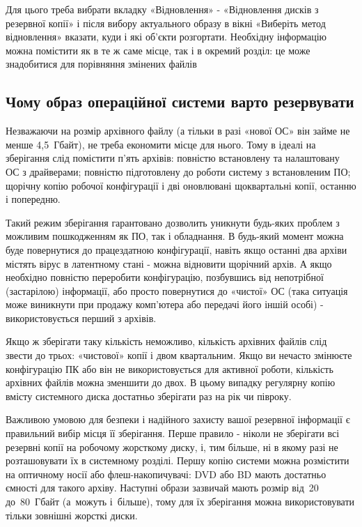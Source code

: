 \documentclass[
	a4paper,
	oneside,
	DIV = 12,
	fontsize = 13pt,
	headings = normal,
]{scrartcl}
\begin{document}
		Для цього треба вибрати вкладку «Відновлення» - «Відновлення дисків з резервної копії» і після вибору актуального образу в вікні «Виберіть метод відновлення» вказати, куди і які об'єкти розгортати. Необхідну інформацію можна помістити як в те ж саме місце, так і в окремий розділ: це може знадобитися для порівняння змінених файлів 

		\subsection*{Чому образ операційної системи варто резервувати}

		Незважаючи на розмір архівного файлу (а тільки в разі «нової ОС» він займе не менше 4{,}5~Гбайт), не треба економити місце для нього. Тому в ідеалі на зберігання слід помістити п'ять архівів: повністю встановлену та налаштовану ОС з драйверами; повністю підготовлену до роботи систему з встановленим ПО; щорічну копію робочої конфігурації і дві оновлювані щоквартальні копії, останню і попередню. 

		Такий режим зберігання гарантовано дозволить уникнути будь-яких проблем з можливим пошкодженням як ПО, так і обладнання. В будь-який момент можна буде повернутися до працездатною конфігурації, навіть якщо останні два архіви містять вірус в латентному стані - можна відновити щорічний архів. А якщо необхідно повністю переробити конфігурацію, позбувшись від непотрібної (застарілою) інформації, або просто повернутися до «чистої» ОС (така ситуація може виникнути при продажу комп'ютера або передачі його іншій особі) - використовується перший з архівів. 

		Якщо ж зберігати таку кількість неможливо, кількість архівних файлів слід звести до трьох: «чистової» копії і двом квартальним. Якщо ви нечасто змінюєте конфігурацію ПК або він не використовується для активної роботи, кількість архівних файлів можна зменшити до двох. В цьому випадку регулярну копію вмісту системного диска достатньо зберігати раз на рік чи півроку. 

		Важливою умовою для безпеки і надійного захисту вашої резервної інформації є правильний вибір місця її зберігання. Перше правило - ніколи не зберігати всі резервні копії на робочому жорсткому диску, і, тим більше, ні в якому разі не розташовувати їх в системному розділі. Першу копію системи можна розмістити на оптичному носії або флеш-накопичувачі: \textenglish{DVD} або \textenglish{BD} мають достатньо ємності для такого архіву. Наступні образи зазвичай мають розмір від~20 до~80~Гбайт (а~можуть і~більше), тому для їх зберігання можна використовувати тільки зовнішні жорсткі диски. 
\end{document}

